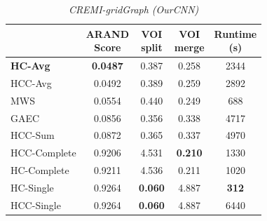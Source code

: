 \begin{table}[t]
        \centering
    \tiny
        \begin{subtable}[t]{0.29\textwidth}
        \centering
        \begin{tabular}[t]{lcccc}
        \toprule
          & \makecell{ARAND\\Score} & \makecell{VOI\\split} & \makecell{VOI\\merge}&  \makecell{Runtime\\(s)} \\ \midrule 
\textbf{HC-Avg} & \textbf{0.0487} & 0.387 & 0.258 & 2344 \\
HCC-Avg & 0.0492 & 0.389 & 0.259 & 2892 \\
MWS \cite{wolf2018mutex} & 0.0554 & 0.440 & 0.249 & 688 \\
GAEC \cite{keuper2015efficient} & 0.0856 & 0.356 & 0.338 & 4717 \\
HCC-Sum & 0.0872 & 0.365 & 0.337 & 4970 \\
HCC-Complete & 0.9206 & 4.531 & \textbf{0.210} & 1330 \\
HC-Complete & 0.9211 & 4.536 & 0.211 & 1020 \\
HC-Single & 0.9264 & \textbf{0.060} & 4.887 & \textbf{312} \\
HCC-Single & 0.9264 & \textbf{0.060} & 4.887 & 6440 \\
        \end{tabular}
    \caption{\emph{CREMI-gridGraph (OurCNN)}}
    \label{tab:scores_gridGraph}
    \centering
    \tiny
    \end{subtable}\hfill

\end{table}
